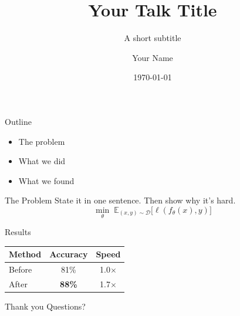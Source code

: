 \documentclass[aspectratio=169, 11pt]{beamer}
\title{Your Talk Title}
\subtitle{A short subtitle}
\author{Your Name}
\institute{Your Institution}
\date{\today}
\begin{document}
\begin{frame}
  \titlepage
\end{frame}

\begin{frame}{Outline}
  \begin{itemize}
    \item The problem
    \item What we did
    \item What we found
  \end{itemize}
\end{frame}

\begin{frame}{The Problem}
  State it in one sentence. Then show why it's hard.
  \begin{equation*}
    \min_{\theta} \; \mathbb{E}_{(x,y)\sim\mathcal{D}} \big[\ell(f_\theta(x), y)\big]
  \end{equation*}
\end{frame}

\begin{frame}{Results}
  \centering
  \begin{tabular}{lcc}
    \toprule
    Method & Accuracy & Speed \\
    \midrule
    Before & 81\% & 1.0$\times$ \\
    After  & \textbf{88\%} & 1.7$\times$ \\
    \bottomrule
  \end{tabular}
\end{frame}

\begin{frame}{Thank you}
  \centering
  \Large Questions?
\end{frame}
\end{document}
